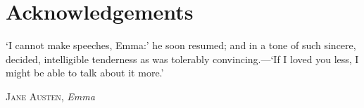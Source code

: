 \chapter{Acknowledgements}

\epigraph{\singlespacing%
`I cannot make speeches, Emma:' he soon resumed; and in a tone of such sincere, decided, intelligible tenderness as was tolerably convincing.---`If I loved you less, I might be able to talk about it more.'
}{\textsc{Jane Austen}, \textit{Emma}}

